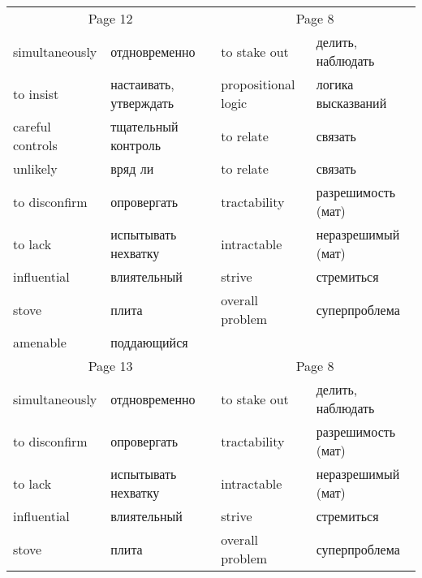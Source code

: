 \documentclass[12pt]{article}
\begin{document}
\begin{tabular}{| l l | l l | }
  \multicolumn{2}{c|}{Page 12} &  \multicolumn{2}{c|}{Page 8} \\
  simultaneously & отдновременно & to stake out & делить, наблюдать \\
  to insist & настаивать, утверждать & propositional logic & логика высказваний \\
  careful controls & тщательный контроль& to relate & связать \\
  unlikely & вряд ли & to relate & связать \\
  to disconfirm & опровергать & tractability & разрешимость (мат) \\
  to lack & испытывать нехватку & intractable & неразрешимый (мат) \\
  influential & влиятельный & strive & стремиться \\
  stove & плита & overall problem & суперпроблема \\
  amenable & поддающийся & & \\ \cline{1-2}
  
  \multicolumn{2}{c|}{Page 13} &  \multicolumn{2}{c|}{Page 8} \\
  simultaneously & отдновременно & to stake out & делить, наблюдать \\
  to disconfirm & опровергать & tractability & разрешимость (мат) \\
  to lack & испытывать нехватку & intractable & неразрешимый (мат) \\
  influential & влиятельный & strive & стремиться \\
  stove & плита & overall problem & суперпроблема \\
  \hline

\end{tabular}
\end{document}
